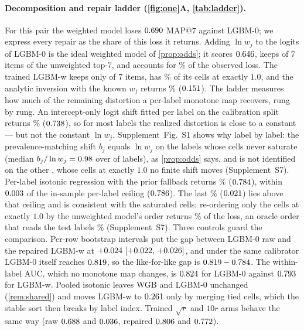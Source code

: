 \documentclass[sigconf,nonacm]{acmart}
\makeatletter
\newcommand{\Sm}{\textsf{LGBM-w}\xspace}
\newcommand{\Wm}{\textsf{WGB}\xspace}
\newcommand{\Nm}{\textsf{LGBM-0}\xspace}
\newcommand{\mapseven}{\mathrm{MAP}@7\xspace}
\newcommand{\Supp}[1]{Supplement~#1}  %
\makeatother
\begin{document}
\paragraph{Decomposition and repair ladder (\cref{fig:one}A, \cref{tab:ladder}).} For this pair the weighted model loses $0.690$ $\mapseven$ against \Nm; we express every repair as the share of this loss it returns. Adding $\ln w_j$ to the logits of \Nm is the ideal weighted model of \cref{prop:odds}; it scores $0.646$, keeps \noverlapWhatif{} of 7 items of the unweighted top-7, and accounts for \noddsShare\% of the observed loss. The trained \Sm keeps only \noverlapS{} of 7 items, has \nSsatOne\% of its cells at exactly $1.0$, and the analytic inversion with the known $w_j$ returns \nelkanShare\% ($0.151$). The ladder measures how much of the remaining distortion a per-label monotone map recovers, rung by rung. An intercept-only logit shift fitted per label on the calibration split returns \noffsetShare\% ($0.738$), so for most labels the realized distortion is close to a constant --- but not the constant $\ln w_j$. \Supp{Fig.~S1} shows why label by label: the prevalence-matching shift $b_j$ equals $\ln w_j$ on the labels whose cells never saturate (median $b_j/\ln w_j=0.98$ over \nSnIdentShift{} of \nnLabels{} labels), as \cref{prop:odds} says, and is not identified on the other \nnCappedShift{}, whose cells at exactly $1.0$ no finite shift moves (\Supp{S7}). Per-label isotonic regression with the prior fallback returns \nrepairShare\% ($0.784$), within $0.003$ of the in-sample per-label ceiling ($0.786$). The last \ntieShare\% ($0.021$) lies above that ceiling and is consistent with the saturated cells: re-ordering only the cells at exactly $1.0$ by the unweighted model's order returns \ntieShareUnw\% of the loss, an oracle order that reads the test labels \ntieShareOracle\% (\Supp{S7}). Three controls guard the comparison. Per-row bootstrap intervals put the gap between \Nm raw and the repaired \Sm at $+0.024~[+0.022,\,+0.026]$, and under the same calibrator \Nm itself reaches $0.819$, so the like-for-like gap is $0.819-0.784$. The within-label AUC, which no monotone map changes, is $0.824$ for \Nm against $0.793$ for \Sm. Pooled isotonic leaves \Wm and \Nm unchanged (\cref{rem:shared}) and moves \Sm to $0.261$ only by merging tied cells, which the stable sort then breaks by label index. Trained $\sqrt{r}$ and $10r$ arms behave the same way (raw $0.688$ and $0.036$, repaired $0.806$ and $0.772$).
\end{document}
